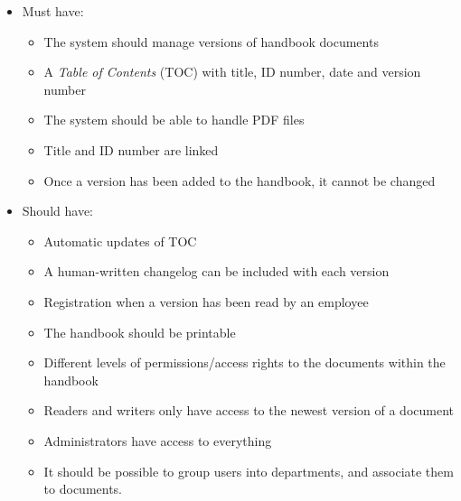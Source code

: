\begin{itemize}
    \item 
    Must have:
        \begin{itemize}
            \item 
            The system should manage versions of handbook documents
            \item 
            A \textit{Table of Contents} (TOC) with title, ID number, date and version number
            \item 
            The system should be able to handle PDF files
            \item 
            Title and ID number are linked
            \item 
            Once a version has been added to the handbook, it cannot be changed
        \end{itemize}
    \item 
    Should have:
        \begin{itemize}
			\item 
			Automatic updates of TOC
            \item 
            A human-written changelog can be included with each version
            \item 
            Registration when a version has been read by an employee
            \item 
            The handbook should be printable
            \item 
            Different levels of permissions/access rights to the documents within the handbook
            \item 
            Readers and writers only have access to the newest version of a document
            \item 
            Administrators have access to everything
            \item 
            It should be possible to group users into departments, and associate them to documents.

\end{itemize}
\end{itemize}
